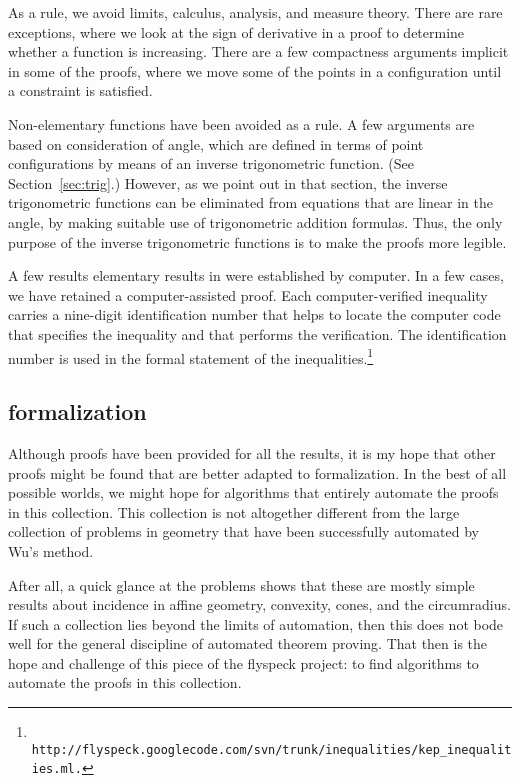 As a rule, we avoid limits, calculus, analysis, and measure theory.
There are rare exceptions, where we look at the sign of derivative in a proof
to determine whether a function is increasing. 
There are a few compactness arguments implicit in some
of the proofs, where we move some of the points in a configuration
until a constraint is satisfied.

Non-elementary functions have been avoided as a rule.  A few
arguments are based on consideration of angle, which are defined
in terms of point configurations by means of an inverse trigonometric
function.  (See Section~\ref{sec:trig}.)  However, as we point
out in that section, the inverse trigonometric functions can be
eliminated from equations that are linear in the angle, by making
suitable use of trigonometric addition formulas.  Thus, the only purpose of
the inverse trigonometric functions is to make the
proofs more legible.

A few results elementary results in \cite{DCG} were established
by computer.  In a few cases, we have retained a computer-assisted
proof.  Each computer-verified inequality carries a nine-digit 
identification
number  that helps to locate the computer code
that specifies the inequality and that performs the verification.
The identification number is used in the formal statement of the
inequalities.\footnote{\tt
http://flyspeck.googlecode.com/svn/trunk/inequalities/kep\_inequalities.ml.}


\subsection{formalization}

Although proofs have been provided for all the results, it is
my hope that other proofs might be found that are better adapted
to formalization.  In the best of all possible
worlds, we might hope for
algorithms that entirely automate the proofs in this collection.
This collection is not altogether different from the large collection
of problems in geometry that have been successfully automated
by Wu's method. 

After all, a quick glance at the problems shows that these are
mostly simple results about incidence in affine geometry, convexity, cones,
and the circumradius.  If such a collection lies beyond
the limits of automation, then this does not bode well for 
the general discipline of automated theorem proving.  That then
is the hope and challenge of this piece of the flyspeck project:
to find algorithms to automate the proofs in this collection.


